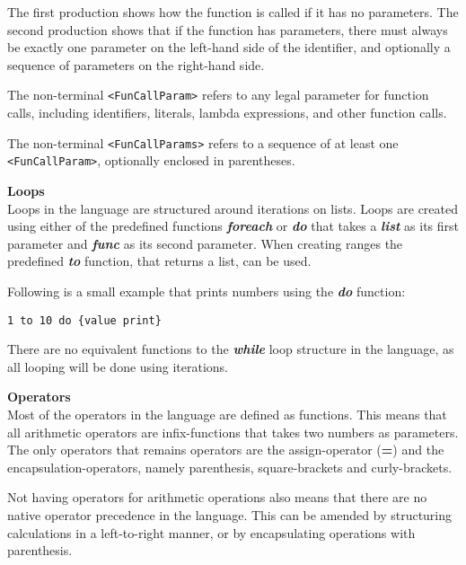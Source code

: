 The first production shows how the function is called if it has no parameters.
The second production shows that if the function has parameters, there must always be exactly one parameter on the left-hand side of the identifier, and optionally a sequence of parameters on the right-hand side.

The non-terminal \texttt{<FunCallParam>} refers to any legal parameter for function calls, including identifiers, literals, lambda expressions, and other function calls.

The non-terminal \texttt{<FunCallParams>} refers to a sequence of at least one \texttt{<FunCallParam>}, optionally enclosed in parentheses.

\textbf{Loops}\\
Loops in the language are structured around iterations on lists.
Loops are created using either of the predefined functions \textbf{\textit{foreach}} or \textbf{\textit{do}} that takes a \textbf{\textit{list}} as its first parameter and \textbf{\textit{func}} as its second parameter.
When creating ranges the predefined \textbf{\textit{to}} function, that returns a list, can be used. 

Following is a small example that prints numbers using the \textbf{\textit{do}} function:
\begin{lstlisting}
1 to 10 do {value print}
\end{lstlisting}
There are no equivalent functions to the \textbf{\textit{while}} loop structure in the language, as all looping will be done using iterations.

\textbf{Operators}\\
Most of the operators in the language are defined as functions.
This means that all arithmetic operators are infix-functions that takes two numbers as parameters. 
The only operators that remains operators are the assign-operator (\textbf{=}) and the encapsulation-operators, namely parenthesis, square-brackets and curly-brackets.

Not having operators for arithmetic operations also means that there are no native operator precedence in the language.
This can be amended by structuring calculations in a left-to-right manner, or by encapsulating operations with parenthesis. 